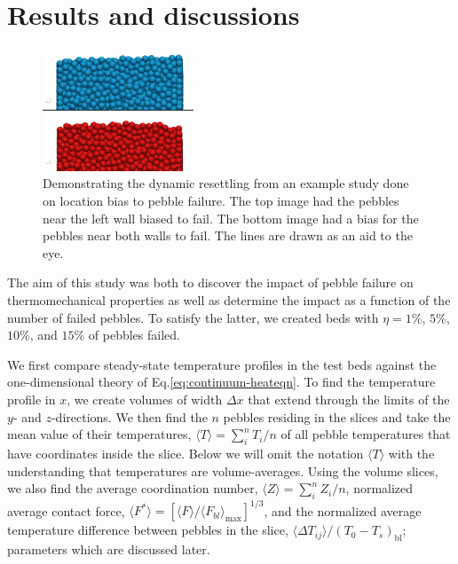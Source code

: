 
\section{Results and discussions}
\label{results}

\begin{figure}[t]
	\centering
	\includegraphics[width=0.4\textwidth]{chapters/figures/settlingStudy}
	\caption{Demonstrating the dynamic resettling from an example study done on location bias to pebble failure. The top image had the pebbles near the left wall biased to fail. The bottom image had a bias for the pebbles near both walls to fail. The lines are drawn as an aid to the eye.}
\label{fig:settlingStudy}
\end{figure}


The aim of this study was both to discover the impact of pebble failure on thermomechanical properties as well as determine the impact as a function of the number of failed pebbles. To satisfy the latter, we created beds with $\eta = 1\%$, $5\%$, $10\%$, and $15\%$ of pebbles failed. 

We first compare steady-state temperature profiles in the test beds against the one-dimensional theory of Eq.\ref{eq:continuum-heateqn}. To find the temperature profile in $x$, we create volumes of width $\Delta x$ that extend through the limits of the $y$- and $z$-directions. We then find the $n$ pebbles residing in the slices and take the mean value of their temperatures, $\langle T\rangle = \sum_{i}^n T_i / n$ of all pebble temperatures that have coordinates inside the slice. Below we will omit the notation $\langle T \rangle$ with the understanding that temperatures are volume-averages. Using the volume slices, we also find the average coordination number, $\langle Z \rangle = \sum_{i}^n Z_i / n$, normalized average contact force, $\langle F^* \rangle=\left[\langle F \rangle/\langle F_{bl} \rangle_\text{max}\right]^{1/3}$, and the normalized average temperature difference between pebbles in the slice, $\langle \Delta T_{ij} \rangle / (T_0 - T_s)_\text{bl}$; parameters which are discussed later.

